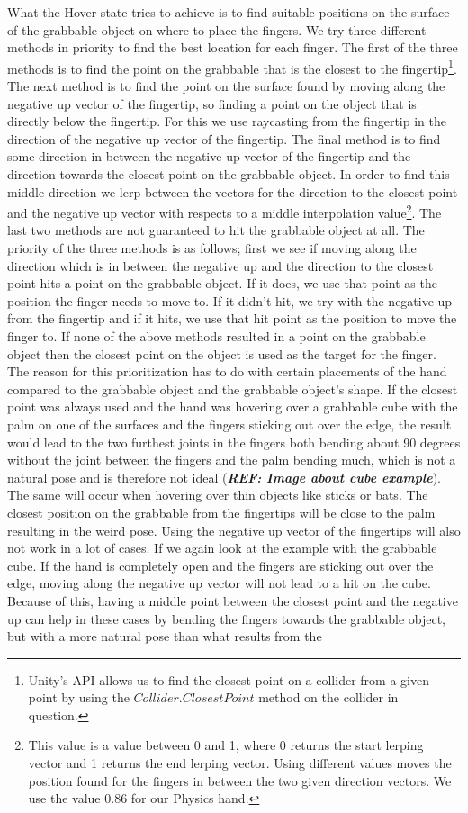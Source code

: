 What the Hover state tries to achieve is to find suitable positions on the surface of the grabbable object on where to place the fingers. We try three different methods in priority to find the best location for each finger. The first of the three methods is to find the point on the grabbable that is the closest to the fingertip\footnote{Unity's API allows us to find the closest point on a collider from a given point by using the $Collider.ClosestPoint$ method on the collider in question.}. The next method is to find the point on the surface found by moving along the negative up vector of the fingertip, so finding a point on the object that is directly below the fingertip. For this we use raycasting from the fingertip in the direction of the negative up vector of the fingertip. The final method is to find some direction in between the negative up vector of the fingertip and the direction towards the closest point on the grabbable object. In order to find this middle direction we lerp between the vectors for the direction to the closest point and the negative up vector with respects to a middle interpolation value\footnote{This value is a value between 0 and 1, where 0 returns the start lerping vector and 1 returns the end lerping vector. Using different values moves the position found for the fingers in between the two given direction vectors. We use the value 0.86 for our Physics hand.}. The last two methods are not guaranteed to hit the grabbable object at all. The priority of the three methods is as follows; first we see if moving along the direction which is in between the negative up and the direction to the closest point hits a point on the grabbable object. If it does, we use that point as the position the finger needs to move to. If it didn't hit, we try with the negative up from the fingertip and if it hits, we use that hit point as the position to move the finger to. If none of the above methods resulted in a point on the grabbable object then the closest point on the object is used as the target for the finger. The reason for this prioritization has to do with certain placements of the hand compared to the grabbable object and the grabbable object's shape. If the closest point was always used and the hand was hovering over a grabbable cube with the palm on one of the surfaces and the fingers sticking out over the edge, the result would lead to the two furthest joints in the fingers both bending about 90 degrees without the joint between the fingers and the palm bending much, which is not a natural pose and is therefore not ideal (\textbf{\textit{REF: Image about cube example}}). The same will occur when hovering over thin objects like sticks or bats. The closest position on the grabbable from the fingertips will be close to the palm resulting in the weird pose. Using the negative up vector of the fingertips will also not work in a lot of cases. If we again look at the example with the grabbable cube. If the hand is completely open and the fingers are sticking out over the edge, moving along the negative up vector will not lead to a hit on the cube. Because of this, having a middle point between the closest point and the negative up can help in these cases by bending the fingers towards the grabbable object, but with a more natural pose than what results from the 